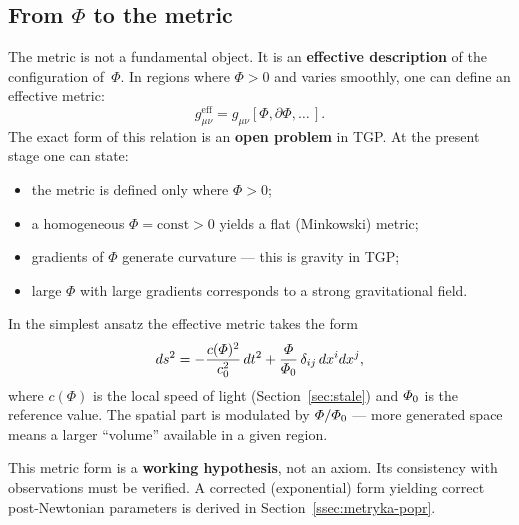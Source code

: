 \subsection{From $\Phi$ to the metric}\label{ssec:metryka}

The metric is not a fundamental object.  It is an \textbf{effective
description} of the configuration of~$\Phi$.  In regions where
$\Phi > 0$ and varies smoothly, one can define an effective metric:
\begin{equation}\label{eq:metric-from-Phi}
    g_{\mu\nu}^{\mathrm{eff}}
    = g_{\mu\nu}[\Phi, \partial\Phi, \ldots\,].
\end{equation}
The exact form of this relation is an \textbf{open problem} in TGP.
At the present stage one can state:
\begin{itemize}[nosep]
  \item the metric is defined only where $\Phi > 0$;
  \item a homogeneous $\Phi = \mathrm{const} > 0$ yields a flat
        (Minkowski) metric;
  \item gradients of $\Phi$ generate curvature --- this is gravity
        in TGP;
  \item large $\Phi$ with large gradients corresponds to a strong
        gravitational field.
\end{itemize}

\begin{hypothesis}\label{hyp:metric}
In the simplest ansatz the effective metric takes the form
\begin{equation}\label{eq:metric-minimal}
    ds^2 = -\frac{c(\varPhi)^2}{c_0^2}\,dt^2
    + \frac{\varPhi}{\varPhi_0}\,\delta_{ij}\,dx^i dx^j,
\end{equation}
where $c(\Phi)$ is the local speed of light
(Section~\ref{sec:stale}) and $\varPhi_0$ is the reference value.
The spatial part is modulated by $\varPhi/\varPhi_0$ --- more generated
space means a larger ``volume'' available in a given region.
\end{hypothesis}

This metric form is a \textbf{working hypothesis}, not an axiom.
Its consistency with observations must be verified.  A corrected
(exponential) form yielding correct post-Newtonian parameters is
derived in Section~\ref{ssec:metryka-popr}.
